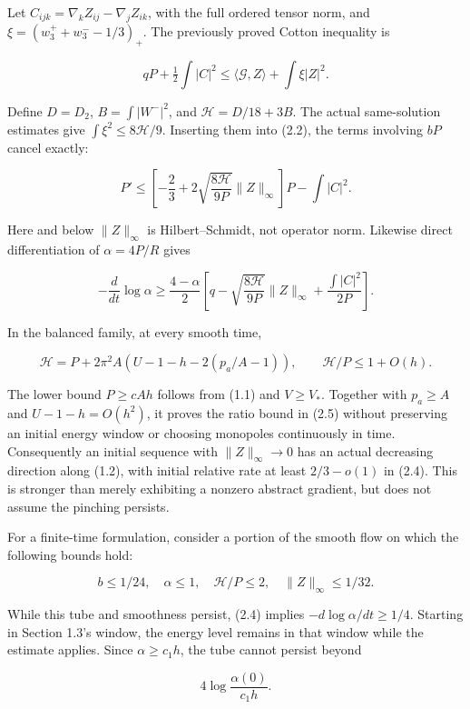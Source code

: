 \documentclass[
  10pt,
]{article}
\begin{document}
Let \(C_{ijk}=\nabla_kZ_{ij}-\nabla_jZ_{ik}\), with the full ordered
tensor norm, and \(\xi=(w_3^++w_3^--1/3)_+\). The previously proved
Cotton inequality is

\[
 qP+\tfrac12\int|C|^2
              \le\langle\mathcal G,Z\rangle+\int\xi|Z|^2.
\]

Define \(D=D_2\), \(B=\int|W^-|^2\), and \(\mathcal H=D/18+3B\). The
actual same-solution estimates give \(\int\xi^2\le8\mathcal H/9\).
Inserting them into (2.2), the terms involving \(bP\) cancel exactly:

\[
 \boxed{P'\le
    \left[-\frac23+2\sqrt{\frac{8\mathcal H}{9P}}\|Z\|_\infty\right]P
                      -\int|C|^2.}                            \tag{2.3}
\]

Here and below \(\|Z\|_\infty\) is Hilbert--Schmidt, not operator norm.
Likewise direct differentiation of \(\alpha=4P/R\) gives

\[
 \boxed{-\frac{d}{dt}\log\alpha\ge\frac{4-\alpha}{2}
 \left[q-\sqrt{\frac{8\mathcal H}{9P}}\|Z\|_\infty
                                  +\frac{\int|C|^2}{2P}\right].} \tag{2.4}
\]

In the balanced family, at every smooth time,

\[
 \mathcal H=P+2\pi^2A(U-1-h-2(p_a/A-1)),
 \qquad \mathcal H/P\le1+O(h).                      \tag{2.5}
\]

The lower bound \(P\ge cAh\) follows from (1.1) and \(V\ge V_*\).
Together with \(p_a\ge A\) and \(U-1-h=O(h^2)\), it proves the ratio
bound in (2.5) without preserving an initial energy window or choosing
monopoles continuously in time. Consequently an initial sequence with
\(\|Z\|_\infty\to0\) has an actual decreasing direction along (1.2),
with initial relative rate at least \(2/3-o(1)\) in (2.4). This is
stronger than merely exhibiting a nonzero abstract gradient, but does
not assume the pinching persists.

For a finite-time formulation, consider a portion of the smooth flow on
which the following bounds hold:

\[
 b\le1/24,\quad \alpha\le1,\quad \mathcal H/P\le2,
 \quad\|Z\|_\infty\le1/32.
\]

While this tube and smoothness persist, (2.4) implies
\(-d\log\alpha/dt\ge1/4\). Starting in Section 1.3's window, the energy
level remains in that window while the estimate applies. Since
\(\alpha\ge c_1h\), the tube cannot persist beyond

\[
                     4\log\frac{\alpha(0)}{c_1h}.              \tag{2.6}
\]
\end{document}
